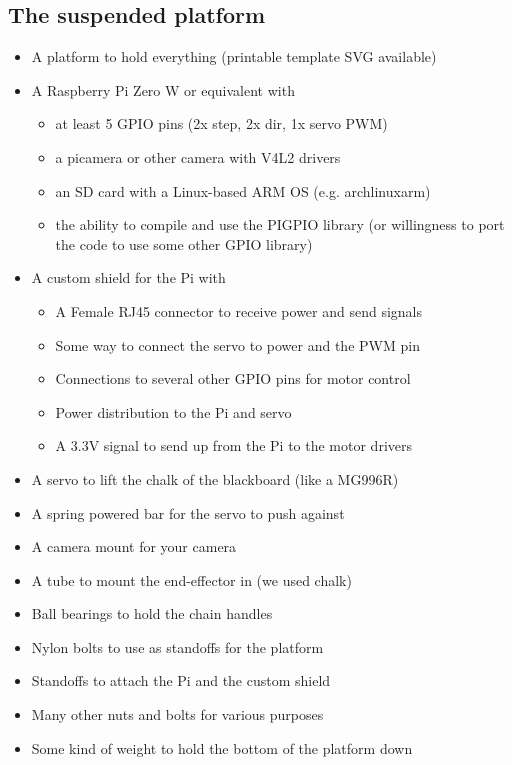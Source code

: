 \documentclass[12pt]{article}
\begin{document}
\subsection*{The suspended platform}
\begin{itemize}
  \item A platform to hold everything (printable template SVG available)
  \item A Raspberry Pi Zero W or equivalent with
  \begin{itemize}
    \item at least 5 GPIO pins (2x step, 2x dir, 1x servo PWM)
    \item a picamera or other camera with V4L2 drivers
    \item an SD card with a Linux-based ARM OS (e.g. archlinuxarm)
    \item the ability to compile and use the PIGPIO library (or
          willingness to port the code to use some other GPIO library)
  \end{itemize}
  \item A custom shield for the Pi with
  \begin{itemize}
    \item A Female RJ45 connector to receive power and send signals
    \item Some way to connect the servo to power and the PWM pin
    \item Connections to several other GPIO pins for motor control
    \item Power distribution to the Pi and servo
    \item A 3.3V signal to send up from the Pi to the motor drivers
  \end{itemize}
  \item A servo to lift the chalk of the blackboard (like a MG996R)
  \item A spring powered bar for the servo to push against
  \item A camera mount for your camera
  \item A tube to mount the end-effector in (we used chalk)
  \item Ball bearings to hold the chain handles
  \item Nylon bolts to use as standoffs for the platform
  \item Standoffs to attach the Pi and the custom shield
  \item Many other nuts and bolts for various purposes
  \item Some kind of weight to hold the bottom of the platform down
\end{itemize}
\end{document}
